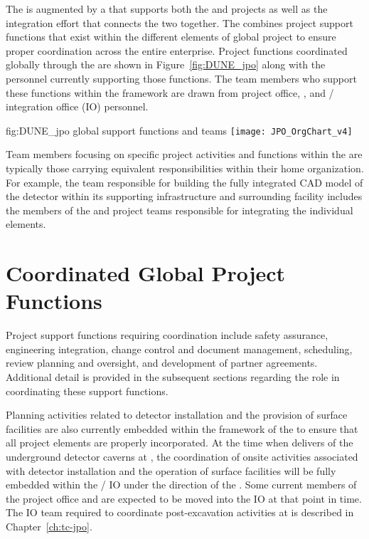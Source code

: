 The  is augmented by a  that supports both 
the  and  projects as well as the integration
effort that connects the two together. The  combines
project support functions that exist within the different elements 
of global project to ensure proper coordination across the entire 
 enterprise.  Project functions coordinated globally 
through the  are shown in Figure~\ref{fig:DUNE_jpo} along 
with the personnel currently supporting those functions.  The team 
members who support these functions within the  framework
are drawn from  project office,  , 
and / integration office (IO) personnel.  
\begin{dunefigure}{fig:DUNE_jpo}
  { global support functions and teams}
  \texttt{[image: JPO\_OrgChart\_v4]}
\end{dunefigure}
Team members focusing on specific project activities and functions 
within the  are typically those carrying equivalent 
responsibilities within their home organization.  For example, 
the  team responsible for building the fully integrated 
\threed CAD model of the detector within its supporting infrastructure 
and surrounding facility includes the members of the  and 
 project teams responsible for integrating the individual 
elements.

\section{Coordinated Global Project Functions}
\label{sec:global_project}

Project support functions requiring  coordination include
safety assurance, engineering integration, change control and document 
management, scheduling, review planning and oversight, and development 
of partner agreements.  Additional detail is provided in the subsequent 
sections regarding the  role in coordinating these support 
functions.

Planning activities related to detector installation and the provision 
of surface facilities are also currently embedded within the framework 
of the  to ensure that all project elements are properly 
incorporated.  At the time when   delivers 
 of the underground detector caverns at , the 
coordination of onsite activities associated with detector installation 
and the operation of surface facilities will be fully embedded within 
the / IO under the direction of the .  
Some current members of the  project office and 
 are expected to be moved into the IO at that point in time.  
The IO team required to coordinate post-excavation activities at 
 is described in Chapter~\ref{ch:tc-jpo}.  


